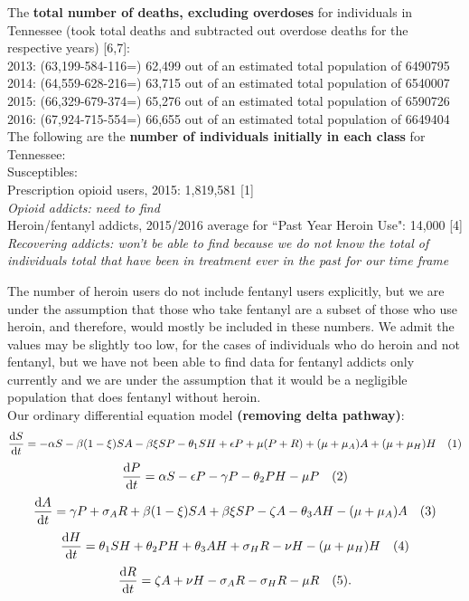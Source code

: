 \documentclass[12pt]{article}
\begin{document}

The \textbf{total number of deaths, excluding overdoses} for individuals in Tennessee (took total deaths and subtracted out overdose deaths for the respective years) [6,7]: \\
2013: (63,199-584-116=) 62,499 out of an estimated total population of 6490795 \\
2014: (64,559-628-216=) 63,715 out of an estimated total population of 6540007 \\
2015: (66,329-679-374=) 65,276 out of an estimated total population of 6590726 \\
2016: (67,924-715-554=) 66,655 out of an estimated total population of 6649404 \\


The following are the \textbf{number of individuals initially in each class} for Tennessee: \\
Susceptibles: \\
Prescription opioid users, 2015: 1,819,581 [1] \\
\textit{Opioid addicts: need to find}  \\ %
Heroin/fentanyl addicts, 2015/2016 average for ``Past Year Heroin Use": 14,000 [4] \\
\textit{Recovering addicts: won't be able to find because we do not know the total of individuals total that have been in treatment ever in the past for our time frame}  

The number of heroin users do not include fentanyl users explicitly, but we are under the assumption that those who take fentanyl are a subset of those who use heroin, and therefore, would mostly be included in these numbers. We admit the values may be slightly too low, for the cases of individuals who do heroin and not fentanyl, but we have not been able to find data for fentanyl addicts only currently and we are under the assumption that it would be a negligible population that does fentanyl without heroin. \\

Our ordinary differential equation model \textbf{(removing delta pathway)}: 
\[\dv{S}{t} = -\alpha S - \beta (1- \xi) SA  -\beta \xi SP- \theta_{1} SH +\epsilon P +\mu (P+R) + (\mu+\mu_{A})A + (\mu+\mu_{H}) H \quad (1)\] 
\[\dv{P}{t} = \alpha S - \epsilon P  - \gamma P - \theta_{2}PH- \mu P    \quad(2)\]
\[\dv{A}{t} = \gamma P + \sigma_{A} R +\beta (1- \xi) SA  +\beta \xi SP -\zeta A - \theta_{3}AH-(\mu + \mu_{A})A   \quad (3)\]
\[\dv{H}{t} = \theta_{1}SH+\theta_{2}PH+\theta_{3}AH + \sigma_{H}R-\nu H-(\mu+\mu_{H})H  \quad (4)\]
\[\dv{R}{t} = \zeta A +\nu H -\sigma_{A}R-\sigma_{H}R -\mu R\quad(5).\]
\end{document}
